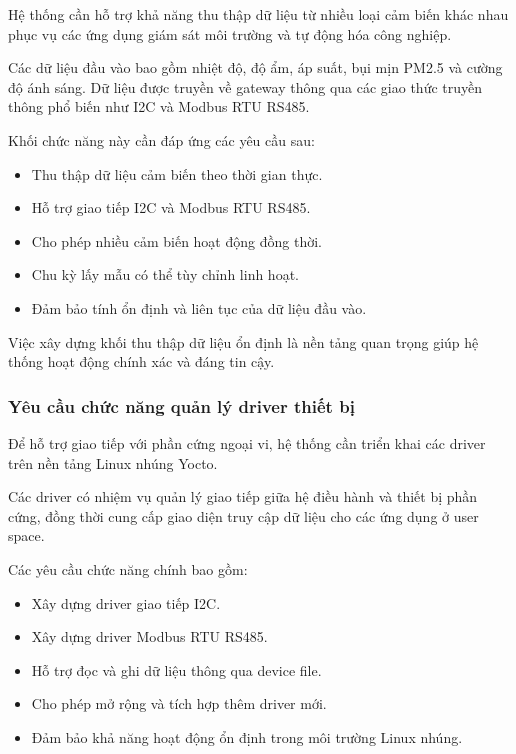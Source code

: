 Hệ thống cần hỗ trợ khả năng thu thập dữ liệu từ nhiều loại cảm biến khác nhau phục vụ các ứng dụng giám sát môi trường và tự động hóa công nghiệp.


Các dữ liệu đầu vào bao gồm nhiệt độ, độ ẩm, áp suất, bụi mịn PM2.5 và cường độ ánh sáng. Dữ liệu được truyền về gateway thông qua các giao thức truyền thông phổ biến như I2C và Modbus RTU RS485.


Khối chức năng này cần đáp ứng các yêu cầu sau:


\begin{itemize}
    \item Thu thập dữ liệu cảm biến theo thời gian thực.
    \item Hỗ trợ giao tiếp I2C và Modbus RTU RS485.
    \item Cho phép nhiều cảm biến hoạt động đồng thời.
    \item Chu kỳ lấy mẫu có thể tùy chỉnh linh hoạt.
    \item Đảm bảo tính ổn định và liên tục của dữ liệu đầu vào.
\end{itemize}


Việc xây dựng khối thu thập dữ liệu ổn định là nền tảng quan trọng giúp hệ thống hoạt động chính xác và đáng tin cậy.


\subsubsection{Yêu cầu chức năng quản lý driver thiết bị}


Để hỗ trợ giao tiếp với phần cứng ngoại vi, hệ thống cần triển khai các driver trên nền tảng Linux nhúng Yocto.


Các driver có nhiệm vụ quản lý giao tiếp giữa hệ điều hành và thiết bị phần cứng, đồng thời cung cấp giao diện truy cập dữ liệu cho các ứng dụng ở user space.


Các yêu cầu chức năng chính bao gồm:


\begin{itemize}
    \item Xây dựng driver giao tiếp I2C.
    \item Xây dựng driver Modbus RTU RS485.
    \item Hỗ trợ đọc và ghi dữ liệu thông qua device file.
    \item Cho phép mở rộng và tích hợp thêm driver mới.
    \item Đảm bảo khả năng hoạt động ổn định trong môi trường Linux nhúng.
\end{itemize}



